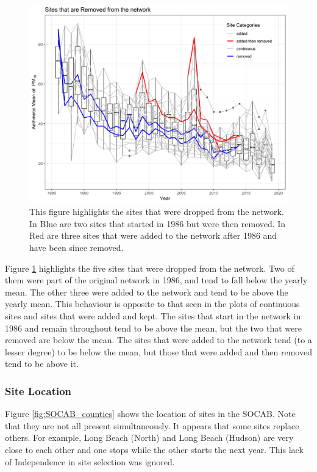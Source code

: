 \begin{figure}[ht]
\centering
\includegraphics[width = \textwidth]{Figures/site_timing_trace-Removed.png}
\caption{This figure highlights the sites that were dropped from the network.  In Blue are two sites that started in 1986 but were then removed.  In Red are three sites that were added to the network after 1986 and have been since removed.  }
\label{fig:site_timing_trace-Removed}
\end{figure}
Figure  \ref{fig:site_timing_trace-Removed} highlights the five sites that were dropped from the network.  Two of them were part of the original network in 1986, and tend to fall below the yearly mean.   The other three were added to the network and tend to be above the yearly mean.  This behaviour is opposite to that seen in the plots of continuous sites and sites that were added and kept.  The sites that start in the network in 1986 and remain throughout tend to be above the mean, but the two that were removed are below the mean.  The sites that were added to the network tend (to a lesser degree) to be below the mean, but those that were added and then removed tend to be above it.

\subsubsection*{Site Location}
\label{subsubsec:sitelocn}
Figure  \ref{fig:SOCAB_counties} shows the location of sites in the \ac{SOCAB}.  Note that they are not all present simultaneously.  
It appears that some sites replace others.  For example, Long Beach (North) and Long Beach (Hudson) are very close to each other and one stops while the other starts the next year.  This lack of Independence in site selection was ignored.

